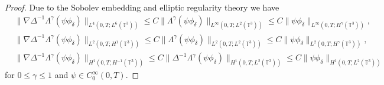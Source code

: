\documentclass[reqno,a4paper,11pt]{amsart}
\theoremstyle{plain}
\numberwithin{equation}{section}
\begin{document}
\begin{proof}
				Due to the Sobolev embedding and elliptic regularity theory  we have
				\begin{align*}
					&\|\nabla\Delta^{-1}\Lambda^{\gamma}(\psi\phi_{\delta})\|_{L^4(0,T;L^{6}(\mathbb{T}^3))} \leq
					C\|\Lambda^{\gamma}(\psi\phi_{\delta})\|_{L^{\infty}(0,T;L^{2}(\mathbb{T}^{3}))}
					\leq C\|\psi\phi_{\delta}\|_{L^{\infty}(0,T;H^{\gamma}(\mathbb{T}^{3}))},
					\\&
					\|\nabla\Delta^{-1}\Lambda^{\gamma}(\psi\phi_{\delta})\|_{L^{2}(0,T;H^{1}(\mathbb{T}^{3}))} \leq
					C\|\Lambda^{\gamma}(\psi\phi_{\delta})\|_{L^{2}(0,T;L^{2}(\mathbb{T}^{3}))}
					\leq C\|\psi\phi_{\delta}\|_{L^{2}(0,T;H^{\gamma}(\mathbb{T}^{3}))},
					\\&
					\|\nabla\Delta^{-1}\Lambda^{\gamma}(\psi\phi_{\delta})\|_{H^{1}(0,T;H^{-1}(\mathbb{T}^{3}))}\leq
					C\|\Delta^{-1}\Lambda^{\gamma}(\psi\phi_{\delta})\|_{H^{1}(0,T;L^{2}(\mathbb{T}^{3}))}
					\leq C\|\psi\phi_{\delta}\|_{H^{1}(0,T;L^{2}(\mathbb{T}^{3}))}
				\end{align*}
				for $0\leq\gamma\leq1$ and $\psi\in C_{0}^{\infty}(0,T)$.

\end{proof}
\end{document}
